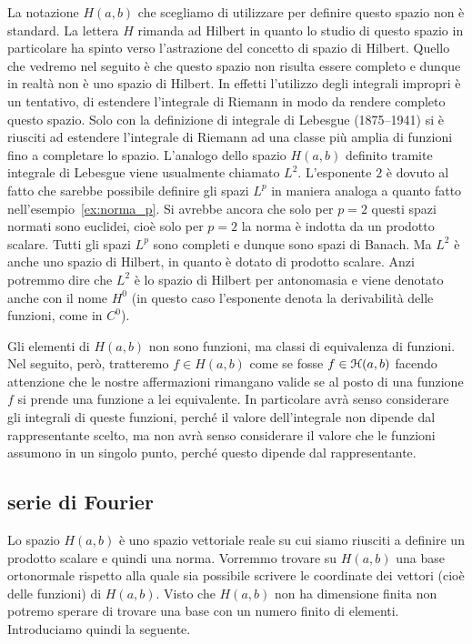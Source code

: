 \begin{remark}
La notazione $H(a,b)$ che scegliamo di utilizzare per definire questo spazio
non è standard. La lettera $H$ rimanda ad Hilbert in quanto lo studio di questo
spazio in particolare ha spinto verso l'astrazione del concetto di spazio di Hilbert.
Quello che vedremo nel seguito è che questo spazio
non risulta essere completo e dunque in realtà non è uno spazio di Hilbert.
In effetti l'utilizzo degli integrali impropri è un tentativo, di
estendere l'integrale di Riemann in modo da rendere completo questo spazio.
Solo con la definizione di integrale di Lebesgue (1875--1941)
si è riusciti ad estendere l'integrale di Riemann
ad una classe più amplia di funzioni fino a completare lo spazio.
L'analogo dello spazio $H(a,b)$ definito tramite integrale di Lebesgue
viene
usualmente chiamato $L^2$. L'esponente $2$ è dovuto al fatto che
sarebbe possibile definire gli spazi $L^p$
in maniera analoga a quanto fatto nell'esempio~\ref{ex:norma_p}.
Si avrebbe ancora che solo per $p=2$ questi spazi normati sono euclidei,
cioè solo per $p=2$ la norma è indotta da un prodotto scalare.
Tutti gli spazi $L^p$ sono completi e dunque sono spazi di Banach.
Ma $L^2$ è anche uno spazio di Hilbert, in quanto è dotato di prodotto scalare.
Anzi potremmo dire che $L^2$ è lo spazio di Hilbert per antonomasia
e viene denotato anche con il nome $H^0$
(in questo caso l'esponente denota la derivabilità delle funzioni, come
in $C^0$).
\end{remark}

Gli elementi di $H(a,b)$ non sono funzioni, ma classi di equivalenza di funzioni.
Nel seguito, però, tratteremo $f\in H(a,b)$ come se fosse $f\in \mathcal H(a,b)$
facendo attenzione che le nostre affermazioni rimangano valide se al posto
di una funzione $f$ si prende una funzione a lei equivalente.
In particolare avrà senso considerare gli integrali di queste funzioni, perché il
valore dell'integrale non dipende dal rappresentante scelto, ma non avrà senso
considerare il valore che le funzioni assumono in un singolo punto, perché
questo dipende dal rappresentante.

\subsection{serie di Fourier}
%
%

Lo spazio $H(a,b)$ è uno spazio vettoriale reale su cui siamo riusciti a definire
un prodotto scalare e quindi una norma. Vorremmo trovare su $H(a,b)$ una base
ortonormale rispetto alla quale sia possibile scrivere le coordinate dei vettori
(cioè delle funzioni) di $H(a,b)$. Visto che $H(a,b)$ non ha dimensione finita
non potremo sperare di trovare una base con un numero finito di elementi.
Introduciamo quindi la seguente.

